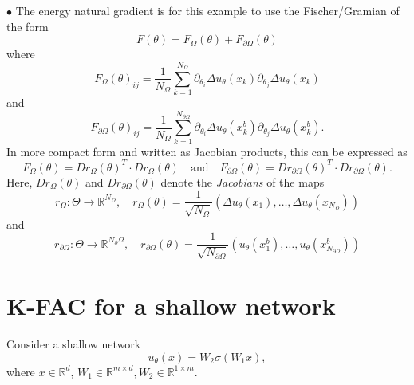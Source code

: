 \documentclass[11pt]{article}
\theoremstyle{definition}
\theoremstyle{plain}
\begin{document}
$\bullet$ The energy natural gradient is for this example to use the Fischer/Gramian of the form
\begin{equation*}
  F(\theta) = F_\Omega(\theta) + F_{\partial\Omega}(\theta)
\end{equation*}
where
\begin{equation}
  F_\Omega(\theta)_{ij} = \frac1{{N_\Omega}} \sum_{k=1}^{N_\Omega} \partial_{\theta_i} \Delta u_\theta(x_k) \partial_{\theta_j} \Delta u_\theta(x_k)
\end{equation}
and
\begin{equation}
  F_{\partial\Omega}(\theta)_{ij} = \frac1{{N_\Omega}} \sum_{k=1}^{N_{\partial\Omega}} \partial_{\theta_i} \Delta u_\theta(x_k^b) \partial_{\theta_j} \Delta u_\theta (x_k^b).
\end{equation}
In more compact form and written as Jacobian products, this can be expressed as
\begin{equation}\label{eq:Jacobian_Fischer}
  F_\Omega(\theta) = Dr_\Omega(\theta)^T \cdot Dr_\Omega(\theta)
  \quad \text{and} \quad
  F_{\partial\Omega}(\theta) = Dr_{\partial\Omega}(\theta)^T \cdot Dr_{\partial\Omega}(\theta).
\end{equation}
Here, $Dr_\Omega(\theta)$ and $Dr_{\partial\Omega}(\theta)$  denote the \emph{Jacobians} of the maps
\begin{equation*}
  r_{\Omega}: \Theta \to \mathbb{R}^{N_\Omega}, \quad r_{\Omega}(\theta) = \frac{1}{\sqrt{N_{\Omega}}}(\Delta u_\theta(x_1), \dots, \Delta u_\theta(x_{N_{\Omega}}))
\end{equation*}
and
\begin{equation*}
  r_{\partial\Omega}: \Theta \to \mathbb{R}^{N_\partial\Omega}, \quad r_{\partial\Omega}(\theta) = \frac{1}{\sqrt{N_{\partial\Omega}}}(u_\theta(x^b_1), \dots, u_\theta(x^b_{N_{\partial\Omega}}))
\end{equation*}

\section{K-FAC for a shallow network}
Consider a shallow network
\[ u_\theta(x) = W_2\sigma(W_1 x), \]
where $x\in\mathbb R^d$, $W_1\in\mathbb R^{m\times d}, W_2\in\mathbb R^{1\times m}$.
\end{document}
